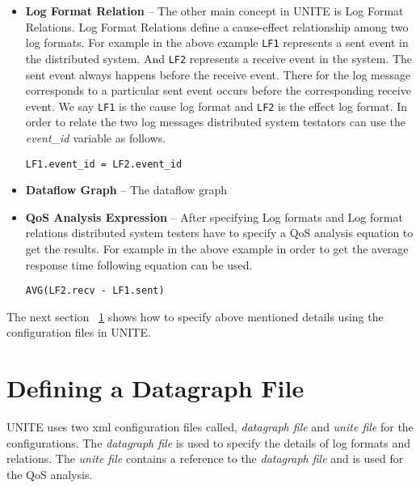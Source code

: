 \begin{itemize}
\begin{table}[h, captionpos=b]
  \caption{List of data types currently supported in UNITE along with their
  description.}
  \label{table:data-types}
\end{table}
  
  \item \textbf{Log Format Relation} -- The other main concept in UNITE 
  is Log Format Relations. Log Format Relations define a cause-effect 
  relationship among two log formats. For example in the above example
  \texttt{LF1} represents a sent event in the distributed system. And \texttt{LF2} 
  represents a receive event in the system. The sent event always 
  happens before the receive event. There for the log message corresponds 
  to a particular sent event occurs before the corresponding receive event.
  We say \texttt{LF1} is the cause log format and \texttt{LF2} is the effect log format. In 
  order to relate the two log messages distributed system testators can use 
  the \textit{event\_id} variable as follows.
  
  \texttt{LF1.event\_id = LF2.event\_id}
  
  \item \textbf{Dataflow Graph} -- The dataflow graph
  

  \item \textbf{QoS Analysis Expression} -- After specifying Log formats and 
  Log format relations distributed system testers have to specify a QoS analysis 
  equation to get the results. For example in the above example in order to 
  get the average response time following equation can be used.
  
  \texttt{AVG(LF2.recv - LF1.sent)}
  
\end{itemize}

The next section ~\ref{sec:unite-config} shows how to specify above 
mentioned details using the configuration files in UNITE.

\section{Defining a Datagraph File}
\label{sec:unite-config}

UNITE uses two xml configuration files called, \textit{datagraph file} and 
\textit{unite file} for the configurations. The \textit{datagraph file} is used to 
specify the details of log formats and relations. The \textit{unite file} 
contains a reference to the \textit{datagraph file} and is used for the 
QoS analysis.

